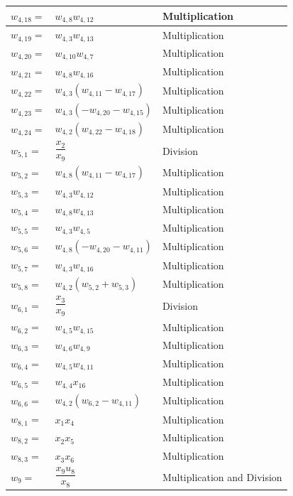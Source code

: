 \begin{longtable}{|p{1.5cm}|l|p{2cm}|}
$w_{4,18}=$ & $ w_{4,8}w_{4,12} $ & Multiplication  \\ \hline
$w_{4,19}=$ & $ w_{4,3}w_{4,13} $ &  Multiplication \\ \hline
$w_{4,20}=$ & $ w_{4,10}w_{4,7} $ &  Multiplication \\ \hline
$w_{4,21}=$ & $ w_{4,8}w_{4,16} $ &  Multiplication \\ \hline
$w_{4,22}=$ & $ w_{4,3}\left(w_{4,11}-w_{4,17}\right) $ & Multiplication  \\ \hline
$w_{4,23}=$ & $ w_{4,3}\left(-w_{4,20}-w_{4,15}\right) $ &  Multiplication \\ \hline
$w_{4,24}=$ & $ w_{4,2}\left(w_{4,22}-w_{4,18}\right) $ &  Multiplication \\ \hline
$w_{5,1}=$ & $ \dfrac{x_{2}}{x_{9}} $ & Division  \\ \hline
$w_{5,2}=$ & $ w_{4,8}\left(w_{4,11}-w_{4,17}\right) $ & Multiplication  \\ \hline
$w_{5,3}=$ & $ w_{4,3}w_{4,12} $ & Multiplication \\ \hline
$w_{5,4}=$ & $ w_{4,8}w_{4,13} $ & Multiplication  \\ \hline
$w_{5,5}=$ & $ w_{4,3}w_{4,5} $ &  Multiplication  \\ \hline
$w_{5,6}=$ & $ w_{4,8}\left(-w_{4,20}-w_{4,11}\right) $ &  Multiplication  \\ \hline
$w_{5,7}=$ & $ w_{4,3}w_{4,16} $ & Multiplication \\ \hline
$w_{5,8}=$ & $ w_{4,2}\left(w_{5,2}+w_{5,3}\right) $ & Multiplication \\ \hline
$w_{6,1}=$ & $ \dfrac{x_{3}}{x_{9}} $ & Division \\ \hline
$w_{6,2}=$ & $ w_{4,5}w_{4,15} $ & Multiplication \\ \hline
$w_{6,3}=$ & $ w_{4,6}w_{4,9} $ & Multiplication \\ \hline
$w_{6,4}=$ & $ w_{4,5}w_{4,11} $ & Multiplication \\ \hline
$w_{6,5}=$ & $ w_{4,4}x_{16} $ & Multiplication \\ \hline
$w_{6,6}=$ & $ w_{4,2}\left(w_{6,2}-w_{4,11}\right) $ & Multiplication \\ \hline
$w_{8,1}=$ & $ x_{1}x_{4} $ & Multiplication \\ \hline
$w_{8,2}=$ & $ x_{2}x_{5} $ & Multiplication \\ \hline
$w_{8,3}=$ & $ x_{3}x_{6} $ & Multiplication \\ \hline
$w_{9}=$ & $ \dfrac{x_{9}u_{8}}{x_{8}} $ & Multiplication and Division \\ \hline

\end{longtable}
